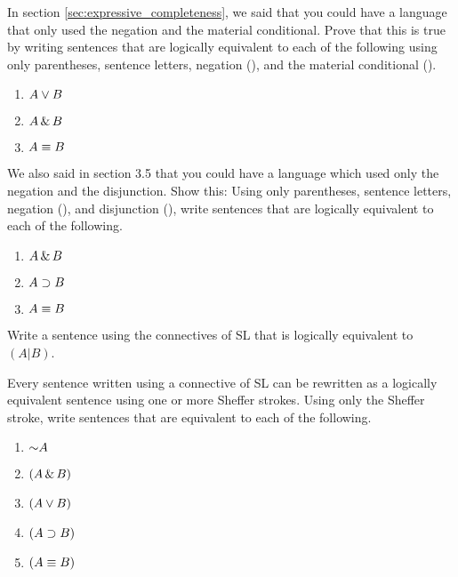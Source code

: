 \practiceproblems
\noindent\problempart
\begin{exercises}
\item In section \ref{sec:expressive_completeness}, we said that you could have a language that only used the negation and the material conditional. Prove that this is true by writing sentences that are logically equivalent to each of the following using only parentheses, sentence letters, negation (\enot), and the material conditional (\eif).
\begin{enumerate}
\item $A\vee B$
\item $A\,\&\, B$
\item $A\equiv B$
\end{enumerate}

\item We also said in section 3.5 that you could have a language which used only the negation and the disjunction. Show this: Using only parentheses, sentence letters, negation (\enot), and disjunction (\eor), write sentences that are logically equivalent to each of the following.
\begin{enumerate}

\item $A \,\&\, B$
\item $A \supset B$
\item $A \equiv B$
\end{enumerate}

\item Write a sentence using the connectives of SL that is logically equivalent to $(A|B)$.
\item Every sentence written using a connective of SL can be rewritten as a logically equivalent sentence using one or more Sheffer strokes. Using only the Sheffer stroke, write sentences that are equivalent to each of the following. 
\begin{enumerate}
\item $\mathord{\sim} A$
\item $(A\,\&\, B)$
\item $(A\vee B)$
\item $(A\supset B)$
\item $(A\equiv B)$
\end{enumerate}
\end{exercises}


